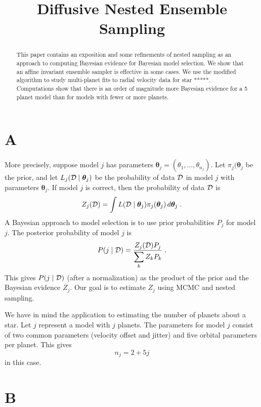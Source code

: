\documentclass[letterpaper, preprint]{aastex}
\newcommand{\bth} {\boldsymbol \theta}
\begin{document}
\title{
  Diffusive Nested Ensemble Sampling
}

\begin{abstract}
This paper contains an exposition and some refinements of nested sampling as an approach to
computing Bayesian evidence for Bayesian model selection.
We show that an affine invariant ensemble sampler is effective in some cases.
We use the modified algorithm to study multi-planet fits to radial velocity data for star *****.
Computations show that there is an order of magnitude more Bayesian evidence for a 5 planet model
than for models with fewer or more planets.


\end{abstract}


\section{A}

More precisely, suppose model $j$ has parameters $\bth_j = (\theta_1,\ldots,\theta_{n_j})$.
Let $\pi_j(\bth_j$ be the prior, and let $L_j({\cal D}\mid \bth_j)$ be the probability of data 
$\cal D$ in model $j$ with parameters $\bth_j$.
If model $j$ is correct, then the probability of data $\cal D$ is
\begin{equation}
Z_j({\cal D}) = \int L({\cal D}\mid \bth_j) \pi_j(\bth_j) \,d\bth_j \; .
\label{Zj}  \end{equation}
A Bayesian approach to model selection is to use prior probabilities $P_j$ for model $j$.
The posterior probability of model $j$ is
$$
P(j\mid {\cal D}) = \frac{Z_j({\cal D})P_j}{\displaystyle \sum_k Z_k P_k} \; .
$$
This gives $P(j\mid{\cal D})$ (after a normalization) as the product of the prior and the 
Bayesian evidence $Z_j$.
Our goal is to estimate $Z_j$ using MCMC and nested sampling.

We have in mind the application to estimating the number of planets about a star.
Let $j$ represent a model with $j$ planets.
The parameters for model $j$ consist of two common parameters (velocity offset and jitter) and five 
orbital parameters per planet.
This gives
$$
n_j = 2 + 5j
$$
in this case.

\section{B}
\end{document}
